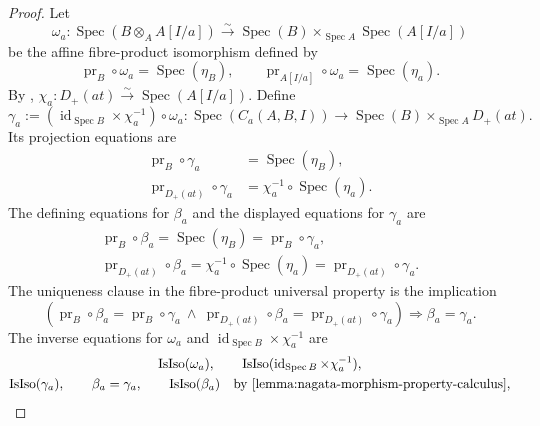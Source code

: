 \begin{proof}
  Let
  \[
    \omega_a\colon
      \operatorname{Spec}(B\otimes_AA[I/a])
      \xrightarrow{\sim}
      \operatorname{Spec}(B)\times_{\operatorname{Spec}A}
        \operatorname{Spec}(A[I/a])
  \]
  be the affine fibre-product isomorphism defined by
  \[
    \operatorname{pr}_B\circ\omega_a=\operatorname{Spec}(\eta_B),
    \qquad
    \operatorname{pr}_{A[I/a]}\circ\omega_a
      =\operatorname{Spec}(\eta_a).
  \]
  By ,
  $\chi_a\colon D_+(at)\xrightarrow{\sim}\operatorname{Spec}(A[I/a])$.
  Define
  \[
    \gamma_a
      :=(\operatorname{id}_{\operatorname{Spec}B}\times\chi_a^{-1})
        \circ\omega_a
      \colon\operatorname{Spec}(C_a(A,B,I))
        \longrightarrow
        \operatorname{Spec}(B)\times_{\operatorname{Spec}A}D_+(at).
  \]
  Its projection equations are
  \[
  \begin{aligned}
    \operatorname{pr}_B\circ\gamma_a
      &=\operatorname{Spec}(\eta_B),\\
    \operatorname{pr}_{D_+(at)}\circ\gamma_a
      &=\chi_a^{-1}\circ\operatorname{Spec}(\eta_a).
  \end{aligned}
  \]
  The defining equations for $\beta_a$ and the displayed equations for
  $\gamma_a$ are
  \[
  \begin{gathered}
    \operatorname{pr}_B\circ\beta_a
      =\operatorname{Spec}(\eta_B)
      =\operatorname{pr}_B\circ\gamma_a,\\
    \operatorname{pr}_{D_+(at)}\circ\beta_a
      =\chi_a^{-1}\circ\operatorname{Spec}(\eta_a)
      =\operatorname{pr}_{D_+(at)}\circ\gamma_a.
  \end{gathered}
  \]
  The uniqueness clause in the fibre-product universal property is the
  implication
  \[
    \left(
      \operatorname{pr}_B\circ\beta_a
        =\operatorname{pr}_B\circ\gamma_a
      \ \wedge\ 
      \operatorname{pr}_{D_+(at)}\circ\beta_a
        =\operatorname{pr}_{D_+(at)}\circ\gamma_a
    \right)
    \Longrightarrow
    \beta_a=\gamma_a.
  \]
  The inverse equations for $\omega_a$ and
  $\operatorname{id}_{\operatorname{Spec}B}\times\chi_a^{-1}$ are
  \[
  \begin{gathered}
    \operatorname{IsIso}(\omega_a),\qquad
    \operatorname{IsIso}
      (\operatorname{id}_{\operatorname{Spec}B}\times\chi_a^{-1}),\\
    \operatorname{IsIso}(\gamma_a),\qquad
    \beta_a=\gamma_a,
    \qquad \operatorname{IsIso}(\beta_a)
      \quad\text{by \Cref{lemma:nagata-morphism-property-calculus}},
  \end{gathered}
  \]
\end{proof}

